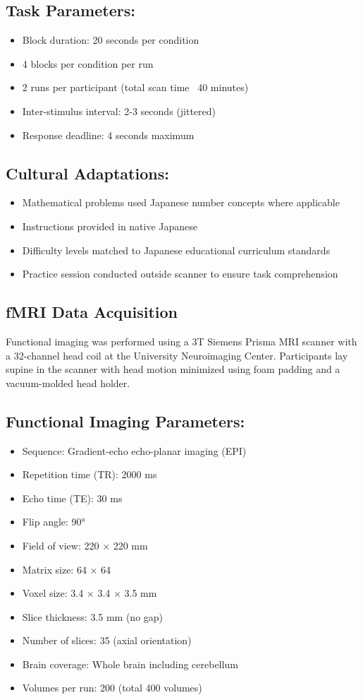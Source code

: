 \subsection*{Task Parameters:}
\begin{itemize}
\item Block duration: 20 seconds per condition
\item 4 blocks per condition per run
\item 2 runs per participant (total scan time ~40 minutes)
\item Inter-stimulus interval: 2-3 seconds (jittered)
\item Response deadline: 4 seconds maximum
\end{itemize}


\subsection*{Cultural Adaptations:}
\begin{itemize}
\item Mathematical problems used Japanese number concepts where applicable
\item Instructions provided in native Japanese
\item Difficulty levels matched to Japanese educational curriculum standards
\item Practice session conducted outside scanner to ensure task comprehension
\end{itemize}


\subsection{fMRI Data Acquisition}
Functional imaging was performed using a 3T Siemens Prisma MRI scanner with a 32-channel head coil at the University Neuroimaging Center. Participants lay supine in the scanner with head motion minimized using foam padding and a vacuum-molded head holder.


\subsection*{Functional Imaging Parameters:}
\begin{itemize}
\item Sequence: Gradient-echo echo-planar imaging (EPI)
\item Repetition time (TR): 2000 ms
\item Echo time (TE): 30 ms
\item Flip angle: 90°
\item Field of view: 220 × 220 mm
\item Matrix size: 64 × 64
\item Voxel size: 3.4 × 3.4 × 3.5 mm
\item Slice thickness: 3.5 mm (no gap)
\item Number of slices: 35 (axial orientation)
\item Brain coverage: Whole brain including cerebellum
\item Volumes per run: 200 (total 400 volumes)
\end{itemize}



